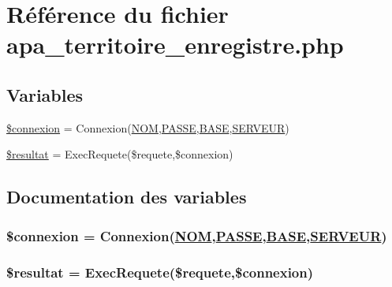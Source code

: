 \hypertarget{apa__territoire__enregistre_8php}{
\section{R\'{e}f\'{e}rence du fichier apa\_\-territoire\_\-enregistre.php}
\label{apa__territoire__enregistre_8php}
}
\subsection*{Variables}
\begin{CompactItemize}
\item 
\hyperlink{apa__territoire__enregistre_8php_a0}{\$connexion} = Connexion(\hyperlink{pma__connect_8php_a0}{NOM},\hyperlink{pma__connect_8php_a1}{PASSE},\hyperlink{pma__connect_8php_a3}{BASE},\hyperlink{pma__connect_8php_a2}{SERVEUR})
\item 
\hyperlink{apa__territoire__enregistre_8php_a1}{\$resultat} = Exec\-Requete(\$requete,\$connexion)
\end{CompactItemize}


\subsection{Documentation des variables}
\hypertarget{apa__territoire__enregistre_8php_a0}{
\subsubsection[\$connexion]{\setlength{\rightskip}{0pt plus 5cm}\$connexion = Connexion(\hyperlink{pma__connect_8php_a0}{NOM},\hyperlink{pma__connect_8php_a1}{PASSE},\hyperlink{pma__connect_8php_a3}{BASE},\hyperlink{pma__connect_8php_a2}{SERVEUR})}}
\label{apa__territoire__enregistre_8php_a0}


\hypertarget{apa__territoire__enregistre_8php_a1}{
\subsubsection[\$resultat]{\setlength{\rightskip}{0pt plus 5cm}\$resultat = Exec\-Requete(\$requete,\$connexion)}}
\label{apa__territoire__enregistre_8php_a1}


